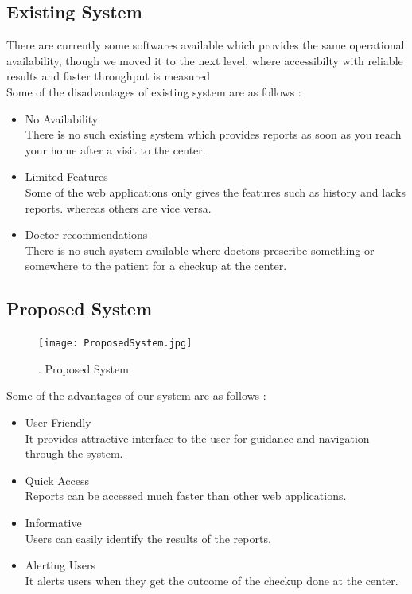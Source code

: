 \documentclass{article}
\begin{document}
\begin{flushleft}
        
        
        \newpage
        \subsection{Existing System}
        There are currently some softwares available which provides the same operational availability, though we moved it to the next level, where accessibilty with reliable results and faster throughput is measured\\
        Some of the disadvantages of existing system are as follows :
        \begin{itemize}
            \item No Availability \\ There is no such existing system which provides reports as soon as you reach your home after a visit to the center.
            \item Limited Features \\ Some of the web applications only gives the features such as history and lacks reports. whereas others are vice versa.
            \item Doctor recommendations \\
            There is no such system available where doctors prescribe something or somewhere to the patient for a checkup at the center. 
        \end{itemize}
        \newpage
        \subsection{Proposed System}
        \begin{figure}[!ht]
              
              \texttt{[image: ProposedSystem.jpg]}
              \renewcommand{\thefigure}{ \thesubsection.\arabic{figure}}
              \caption{ .  Proposed System}
            \end{figure}
        Some of the advantages of our system are as follows :
        \begin{itemize}
            \item User Friendly \\
            It provides attractive interface to the user for guidance and navigation through the system.
            \item Quick Access \\
            Reports can be accessed much faster than other web applications.
            \item Informative \\
            Users can easily identify the results of the reports.
            \item Alerting Users \\
            It alerts users when they get the outcome of the checkup done at the center.  
        \end{itemize}
        \newpage

\end{flushleft}
\end{document}
